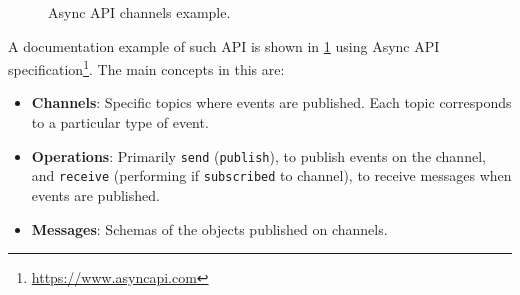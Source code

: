 \documentclass[12pt,a4paper,openright,twoside]{book}
\begin{document}
\begin{figure}
    \centering
    \hfill
    
    \caption{Async \ac{API} channels example.}%
    \label{fig:async-api}
\end{figure}

A documentation example of such \ac{API} is shown in \cref{fig:async-api} using Async \ac{API} specification\footnote{\href{https://www.asyncapi.com}{https://www.asyncapi.com}}. The main concepts in this are:

\begin{itemize}
    \item \textbf{Channels}: Specific topics where events are published. Each topic corresponds to a particular type of event.
    \item \textbf{Operations}: Primarily \texttt{send} (\texttt{publish}), to publish events on the channel, and \texttt{receive} (performing if \texttt{subscribed} to channel), to receive messages when events are published.
    \item \textbf{Messages}: Schemas of the objects published on channels.
\end{itemize}
\end{document}
